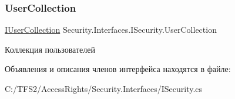\subsubsection{\texorpdfstring{User\+Collection}{UserCollection}}
{\footnotesize\ttfamily \hyperlink{interface_security_1_1_interfaces_1_1_collections_1_1_i_user_collection}{I\+User\+Collection} Security.\+Interfaces.\+I\+Security.\+User\+Collection\hspace{0.3cm}{\ttfamily [get]}}



Коллекция пользователей 



Объявления и описания членов интерфейса находятся в файле\+:\begin{DoxyCompactItemize}
\item 
C\+:/\+T\+F\+S2/\+Access\+Rights/\+Security.\+Interfaces/I\+Security.\+cs\end{DoxyCompactItemize}
